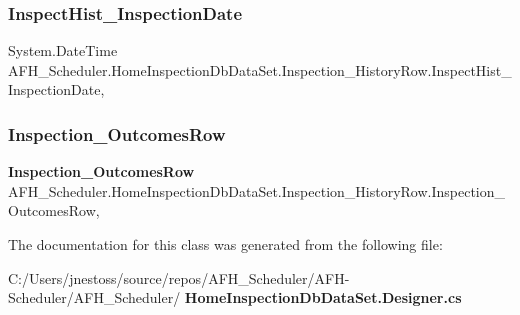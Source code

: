 \subsubsection{InspectHist\_InspectionDate}
{\footnotesize\ttfamily System.\+Date\+Time A\+F\+H\+\_\+\+Scheduler.\+Home\+Inspection\+Db\+Data\+Set.\+Inspection\+\_\+\+History\+Row.\+Inspect\+Hist\+\_\+\+Inspection\+Date\hspace{0.3cm}{\ttfamily [get]}, {\ttfamily [set]}}

\mbox{\label{class_a_f_h___scheduler_1_1_home_inspection_db_data_set_1_1_inspection___history_row_ac124d0b2ebd497cbd092c6479d3a5a98}} 
\subsubsection{Inspection\_OutcomesRow}
{\footnotesize\ttfamily \textbf{ Inspection\+\_\+\+Outcomes\+Row} A\+F\+H\+\_\+\+Scheduler.\+Home\+Inspection\+Db\+Data\+Set.\+Inspection\+\_\+\+History\+Row.\+Inspection\+\_\+\+Outcomes\+Row\hspace{0.3cm}{\ttfamily [get]}, {\ttfamily [set]}}



The documentation for this class was generated from the following file\+:\begin{DoxyCompactItemize}
\item 
C\+:/\+Users/jnestoss/source/repos/\+A\+F\+H\+\_\+\+Scheduler/\+A\+F\+H-\/\+Scheduler/\+A\+F\+H\+\_\+\+Scheduler/\textbf{ Home\+Inspection\+Db\+Data\+Set.\+Designer.\+cs}\end{DoxyCompactItemize}
